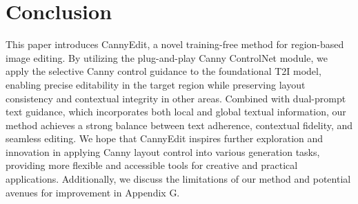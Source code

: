 \documentclass{article}
\newcommand{\kc}[1]{\textcolor{blue}{#1}}
\begin{document}







\vspace{-1mm}
\section{Conclusion}
\vspace{-1mm}

This paper introduces CannyEdit, a novel training-free method for region-based image editing. By utilizing the plug-and-play Canny ControlNet module, we apply the selective Canny control guidance to the foundational T2I model, enabling precise editability in the target region while preserving layout consistency and contextual integrity in other areas. Combined with dual-prompt text guidance, which incorporates both local and global textual information, our method achieves a strong balance between text adherence, contextual fidelity, and seamless editing. We hope that CannyEdit inspires further exploration and innovation in applying Canny layout control into various generation tasks, providing more flexible and accessible tools for creative and practical applications.  Additionally, we discuss the limitations of our method and potential avenues for improvement in Appendix G.
\end{document}
